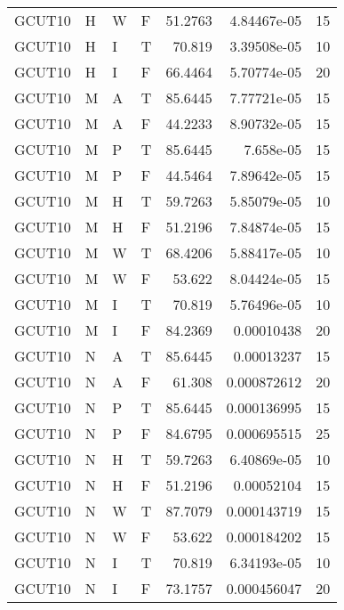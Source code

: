 \begin{table}[!htb]
{\begin{tabular}{llllrrr}
            GCUT10   & H     & W     & F          & 51.2763    & 4.84467e-05 & 15       \\
            GCUT10   & H     & I     & T          & 70.819     & 3.39508e-05 & 10       \\
            GCUT10   & H     & I     & F          & 66.4464    & 5.70774e-05 & 20       \\
            GCUT10   & M     & A     & T          & 85.6445    & 7.77721e-05 & 15       \\
            GCUT10   & M     & A     & F          & 44.2233    & 8.90732e-05 & 15       \\
            GCUT10   & M     & P     & T          & 85.6445    & 7.658e-05   & 15       \\
            GCUT10   & M     & P     & F          & 44.5464    & 7.89642e-05 & 15       \\
            GCUT10   & M     & H     & T          & 59.7263    & 5.85079e-05 & 10       \\
            GCUT10   & M     & H     & F          & 51.2196    & 7.84874e-05 & 15       \\
            GCUT10   & M     & W     & T          & 68.4206    & 5.88417e-05 & 10       \\
            GCUT10   & M     & W     & F          & 53.622     & 8.04424e-05 & 15       \\
            GCUT10   & M     & I     & T          & 70.819     & 5.76496e-05 & 10       \\
            GCUT10   & M     & I     & F          & 84.2369    & 0.00010438  & 20       \\
            GCUT10   & N     & A     & T          & 85.6445    & 0.00013237  & 15       \\
            GCUT10   & N     & A     & F          & 61.308     & 0.000872612 & 20       \\
            GCUT10   & N     & P     & T          & 85.6445    & 0.000136995 & 15       \\
            GCUT10   & N     & P     & F          & 84.6795    & 0.000695515 & 25       \\
            GCUT10   & N     & H     & T          & 59.7263    & 6.40869e-05 & 10       \\
            GCUT10   & N     & H     & F          & 51.2196    & 0.00052104  & 15       \\
            GCUT10   & N     & W     & T          & 87.7079    & 0.000143719 & 15       \\
            GCUT10   & N     & W     & F          & 53.622     & 0.000184202 & 15       \\
            GCUT10   & N     & I     & T          & 70.819     & 6.34193e-05 & 10       \\
            GCUT10   & N     & I     & F          & 73.1757    & 0.000456047 & 20       \\
            \hline
        \end{tabular}
    }{}
\end{table}